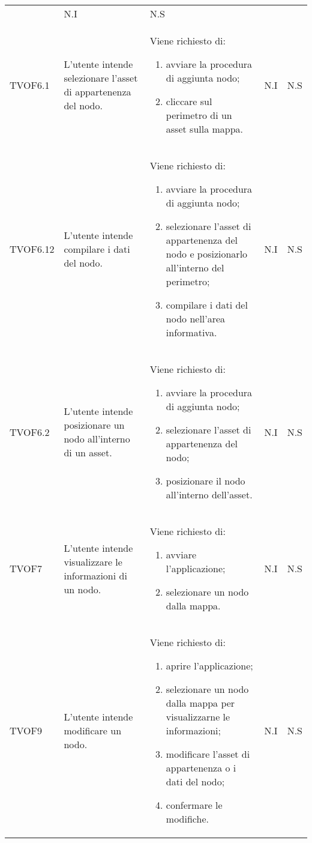 \begin{longtable}{p{1.8cm}!{\VRule[1pt]}p{3.5cm}!{\VRule[1pt]}p{5.5cm}!{\VRule[1pt]}p{1cm}!{\VRule[1pt]}p{1cm}}
\begin{enumerate}
	\end{enumerate} & N.I & N.S \\ 
	TVOF6.1 & L'utente intende selezionare l'asset di appartenenza del nodo. & Viene richiesto di: \begin{enumerate} 
		\item avviare la procedura di aggiunta nodo; 
		\item cliccare sul perimetro di un asset sulla mappa. 
	\end{enumerate} & N.I & N.S \\ 
	TVOF6.12 & L'utente intende compilare i dati del nodo. & Viene richiesto di: \begin{enumerate} 
		\item avviare la procedura di aggiunta nodo; 
		\item selezionare l'asset di appartenenza del nodo e posizionarlo all'interno del perimetro; 
		\item compilare i dati del nodo nell'area informativa. 
	\end{enumerate} & N.I & N.S \\ 
	TVOF6.2 & L'utente intende posizionare un nodo all'interno di un asset. & Viene richiesto di: \begin{enumerate} 
		\item avviare la procedura di aggiunta nodo; 
		\item selezionare l'asset di appartenenza del nodo; 
		\item posizionare il nodo all'interno dell'asset. 
	\end{enumerate} & N.I & N.S \\ 
	TVOF7 & L'utente intende visualizzare le informazioni di un nodo. & Viene richiesto di: \begin{enumerate} 
		\item avviare l'applicazione; 
		\item selezionare un nodo dalla mappa. 
	\end{enumerate} & N.I & N.S \\ 
	TVOF9 & L'utente intende modificare un nodo. & Viene richiesto di: \begin{enumerate} 
		\item aprire l'applicazione; 
		\item selezionare un nodo dalla mappa per visualizzarne le informazioni; 
		\item modificare l'asset di appartenenza o i dati del nodo; 
		\item confermare le modifiche. 
	\end{enumerate} & N.I & N.S \\ 

\end{longtable}
